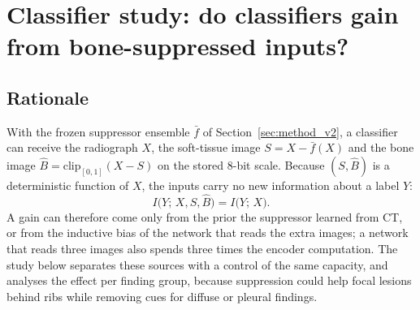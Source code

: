 \section{Classifier study: do classifiers gain from bone-suppressed inputs?}
\label{sec:classifier}

\subsection{Rationale}
\label{sec:cls_intro}
With the frozen suppressor ensemble $\bar f$ of Section~\ref{sec:method_v2}, a classifier can receive the radiograph $X$, the soft-tissue image
$S=X-\bar f(X)$ and the bone image $\hat B=\mathrm{clip}_{[0,1]}(X-S)$ on the stored 8-bit scale. Because $(S,\hat B)$ is a deterministic function
of $X$, the inputs carry no new information about a label $Y$:
\begin{equation}
I\big(Y;\,X,S,\hat B\big)=I\big(Y;\,X\big).
\label{eq:info}
\end{equation}
A gain can therefore come only from the prior the suppressor learned from CT, or from the inductive bias of the network that reads the extra
images; a network that reads three images also spends three times the encoder computation. The study below separates these sources with a
control of the same capacity, and analyses the effect per finding group, because suppression could help focal lesions behind ribs while
removing cues for diffuse or pleural findings.

